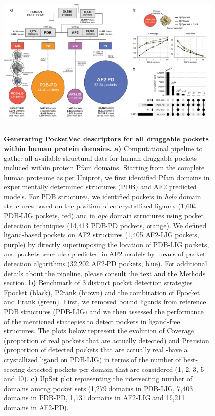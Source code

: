 \begin{figure}[t!]
  \centering
  \includegraphics[width=1\linewidth]{figures/PocketVec/Main/Fig2.png} 
  \caption{
    \textbf{Generating PocketVec descriptors for all druggable pockets within human protein domains.} 
    \textbf{a)} Computational pipeline to gather all available structural data for human druggable pockets included within protein Pfam domains. Starting from the complete human proteome as per Uniprot, we first identified Pfam domains in experimentally determined structures (PDB) and AF2 predicted models. For PDB structures, we identified pockets in \textit{holo} domain structures based on the position of co-crystallized ligands (1,604 PDB-LIG pockets, red) and in \textit{apo} domain structures using pocket detection techniques (14,413 PDB-PD pockets, orange). We defined ligand-based pockets on AF2 structures (1,405 AF2-LIG pockets, purple) by directly superimposing the location of PDB-LIG pockets, and pockets were also predicted in AF2 models by means of pocket detection algorithms (32,202 AF2-PD pockets, blue).  For additional details about the pipeline, please consult the text and the \hyperref[PocketVec_Methods]{Methods} section.
    \textbf{b)} Benchmark of 3 distinct pocket detection strategies: Fpocket (black), P2rank (brown) and the combination of Fpocket and Prank (green). First, we removed bound ligands from reference PDB structures (PDB-LIG) and we then assessed the performance of the mentioned strategies to detect pockets in ligand-free structures. The plots below represent the evolution of Coverage (proportion of real pockets that are actually detected) and Precision (proportion of detected pockets that are actually real -have a crystallized ligand on PDB-LIG) in terms of the number of best-scoring detected pockets per domain that are considered (1, 2, 3, 5 and 10).
    \textbf{c)} UpSet plot representing the intersecting number of domains among pocket sets (1,279 domains in PDB-LIG, 7,403 domains in PDB-PD, 1,131 domains in AF2-LIG and 19,211 domains in AF2-PD).
  }
  \rule[0ex]{\textwidth}{0.5pt}
  \vspace{-5mm}
  
  \label{PocketVec_Fig2}
\end{figure}


